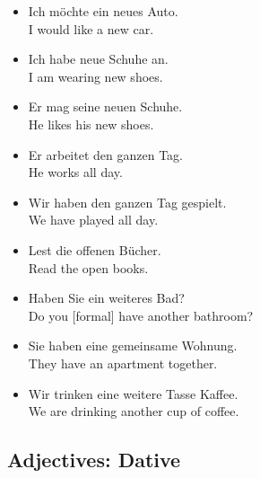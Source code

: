 \begin{itemize}
  \item  Ich m{\"o}chte ein neues Auto. \\ I would like a new car.
	\item  Ich habe neue Schuhe an. \\ I am wearing new shoes.
	\item  Er mag seine neuen Schuhe. \\ He likes his new shoes.
	\item  Er arbeitet den ganzen Tag. \\ He works all day.
	\item  Wir haben den ganzen Tag gespielt. \\ We have played all day.
	\item  Lest die offenen B{\"u}cher. \\ Read the open books.
	\item  Haben Sie ein weiteres Bad? \\ Do you [formal] have another bathroom?
	\item  Sie haben eine gemeinsame Wohnung. \\ They have an apartment together.
	\item  Wir trinken eine weitere Tasse Kaffee. \\ We are drinking another cup of coffee.
\end{itemize}


\pagebreak
\subsection{Adjectives:  Dative}

